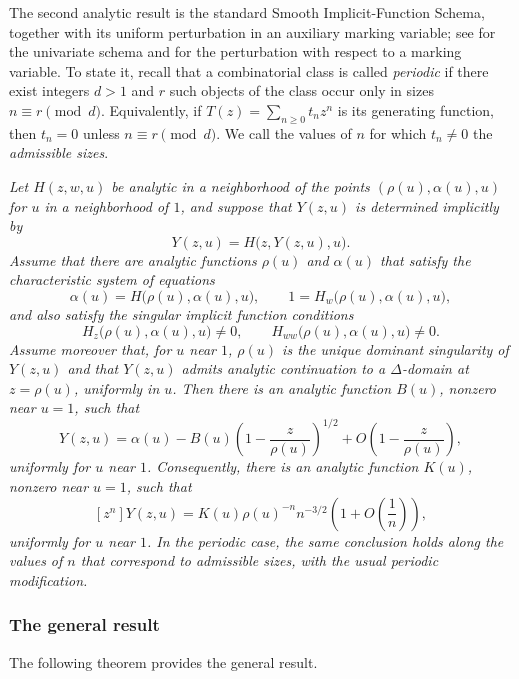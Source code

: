 \documentclass[11pt, onesided]{amsart}
\theoremstyle{remark}
\begin{document}
The second analytic result is the standard Smooth Implicit-Function Schema, together with its uniform perturbation in an auxiliary marking variable; see \cite[Section VII.4.1 and Theorem VII.3]{FlajoletSedgewick} for the univariate schema and \cite[Section IX.7]{FlajoletSedgewick} for the perturbation with respect to a marking variable. To state it, recall that a combinatorial class is called \emph{periodic} if there exist integers $d>1$ and $r$ such objects of the class occur only in sizes $n\equiv r\pmod d$. Equivalently, if $T(z)=\sum_{n\geq 0} t_n z^n$ is its generating function, then $t_n=0$ unless $n\equiv r\pmod d$. We call the values of $n$ for which $t_n\neq 0$ the \emph{admissible sizes}.

\emph{
Let $H(z,w,u)$ be analytic in a neighborhood of the points
$(\rho(u),\alpha(u),u)$ for $u$ in a neighborhood of $1$, and suppose that
$Y(z,u)$ is determined implicitly by
\[
Y(z,u)=H\big(z,Y(z,u),u\big).
\]
Assume that there are analytic functions $\rho(u)$ and $\alpha(u)$ that satisfy the characteristic system of equations
\[
\alpha(u)=H\big(\rho(u),\alpha(u),u\big),
\qquad
1=H_w\big(\rho(u),\alpha(u),u\big),
\]
and also satisfy the singular implicit function conditions
\[
H_z\big(\rho(u),\alpha(u),u\big)\neq 0,
\qquad
H_{ww}\big(\rho(u),\alpha(u),u\big)\neq 0.
\]
Assume moreover that, for $u$ near $1$, $\rho(u)$ is the unique dominant
singularity of $Y(z,u)$ and that $Y(z,u)$ admits analytic continuation to a
$\Delta$-domain at $z=\rho(u)$, uniformly in $u$. Then there is an analytic
function $B(u)$, nonzero near $u=1$, such that
\[
Y(z,u)=\alpha(u)-B(u)\left(1-\frac{z}{\rho(u)}\right)^{1/2}
+O\left(1-\frac{z}{\rho(u)}\right),
\]
uniformly for $u$ near $1$. Consequently, there is an analytic function
$K(u)$, nonzero near $u=1$, such that
\[
[z^n]Y(z,u)
=K(u)\rho(u)^{-n}n^{-3/2}
\left(1+O\left(\frac1n\right)\right),
\]
uniformly for $u$ near $1$. In the periodic case, the same conclusion holds
along the values of $n$ that correspond to admissible sizes, with the usual periodic modification.
}

\subsubsection{The general result}\label{subsubsec:generalresult}
 The following theorem provides the general result. 
\end{document}
